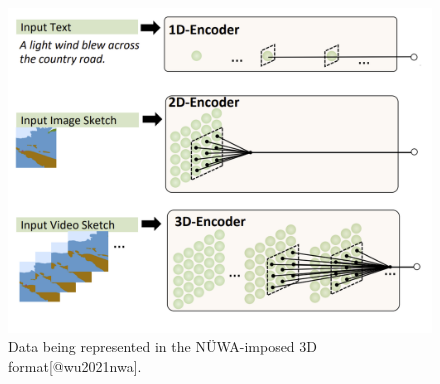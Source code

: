 \documentclass[
]{krantz}
\begin{document}
\begin{figure}

{\centering \includegraphics[width=1\linewidth]{figures/03-01/nuwa} 

}

\caption{Data being represented in the NÜWA-imposed 3D format[@wu2021nwa].}\label{fig:nuwa}
\end{figure}
\end{document}
